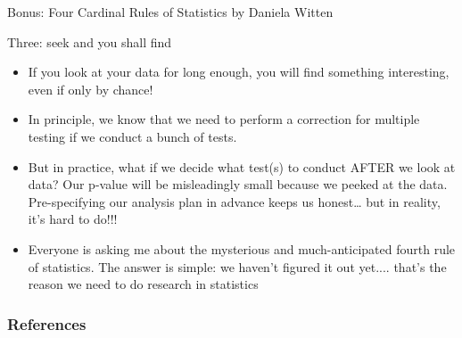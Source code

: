 \documentclass[handout]{beamer}
\begin{document}
\begin{frame}{Bonus: Four Cardinal Rules of Statistics by Daniela Witten}
\scriptsize{


\begin{block}{Three: seek and you shall find}
\begin{itemize}
 \item If you look at your data for long enough, you will find something interesting, even if only by chance! 
 \item  In principle, we know that we need to perform a correction for multiple testing if we conduct a bunch of tests.
\item But in practice, what if we decide what test(s) to conduct AFTER we look at data?  Our p-value will be misleadingly small because we peeked at the data.  Pre-specifying our analysis plan in advance keeps us honest… but in reality, it’s hard to do!!!
\end{itemize}

 
\end{block}


\begin{itemize}
\item Everyone is asking me about the mysterious and much-anticipated fourth rule of statistics. The answer is simple: we haven’t figured it out yet.... that’s the reason we need to do research in statistics
\end{itemize}

} 
\end{frame}

\begin{frame}[allowframebreaks]\scriptsize
\frametitle{References}


%
\end{frame}  





\end{document}
